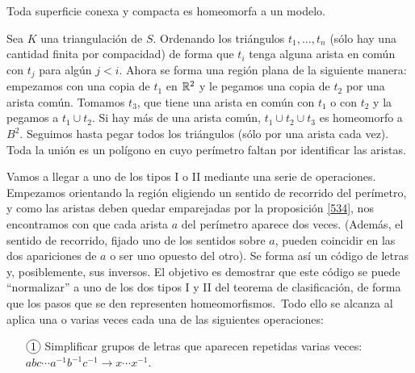 \documentclass[GTS.tex]{subfiles}
\begin{document}
\begin{teorema}
Toda superficie conexa y compacta es homeomorfa a un modelo.
\end{teorema}
\begin{dem}
Sea $K$ una triangulación de $S$. Ordenando los triángulos $t_1,\dots,t_n$ (sólo hay una cantidad finita por compacidad) de forma que $t_i$ tenga alguna arista en común con $t_j$ para algún $j<i$. Ahora se forma una región plana de la siguiente manera: empezamos con una copia de $t_1$ en $\mathbb{R}^2$ y le pegamos una copia de $t_2$ por una arista común. Tomamos $t_3$, que tiene una arista en común con $t_1$ o con $t_2$ y la pegamos a $t_1\cup t_2$. Si hay más de una arista común, $t_1\cup t_2\cup t_3$ es homeomorfo a $B^2$. Seguimos hasta pegar todos los triángulos (sólo por una arista cada vez). Toda la unión es un polígono en cuyo perímetro faltan por identificar las aristas. 

Vamos a llegar a uno de los tipos I o II mediante una serie de operaciones. Empezamos orientando la región eligiendo un sentido de recorrido del perímetro, y como las aristas deben quedar emparejadas por la proposición \ref{534}, nos encontramos con que cada arista $a$ del perímetro aparece dos veces. (Además, el sentido de recorrido, fijado uno de los sentidos sobre $a$, pueden coincidir en las dos apariciones de $a$ o ser uno opuesto del otro). Se forma así un código de letras y, posiblemente, sus inversos. El objetivo es demostrar que este código se puede ``normalizar'' a uno de los dos tipos I y II del teorema de clasificación, de forma que los pasos que se den representen homeomorfismos.\
Todo ello se alcanza al aplica una o varias veces cada una de las siguientes operaciones:
\begin{enumerate}
\item[$\circled{1}$] Simplificar grupos de letras que aparecen repetidas varias veces: $abc\cdots a^{-1}b^{-1}c^{-1}\longrightarrow x\cdots x^{-1}$.


\end{enumerate}
\end{dem}
\end{document}
